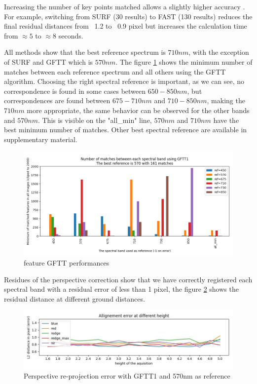 \documentclass[]{elsarticle}
\begin{document}
	\par Increasing the number of key points matched allows a slightly higher accuracy \cite{DantasDiasJunior, }.
	For example, switching from SURF (30 results) to FAST (130 results) reduces the final residual distances from ~1.2 to ~0.9 pixel but increases the calculation time from $\approx 5$ to $\approx 8$ seconds.
	\\
	\par All methods show that the best reference spectrum is $710nm$, with the exception of SURF and GFTT which is $570nm$.
	The figure \ref{fig:features-GFTT-performances} shows the minimum number of matches between each reference spectrum and all others using the GFTT algorithm.
	Choosing the right spectral reference is important, as we can see, no correspondence is found in some cases between $650-850nm$,
	but correspondences are found between $675-710nm$ and $710-850nm$, making the $710nm$ more appropriate,
	the same behavior can be observed for the other bands and $570nm$.
	This is visible on the "all\_min" line, $570nm$ and $710nm$ have the best minimum number of matches.
	Other best spectral reference are available in supplementary material.
	
	\begin{figure}[H]
		\centering
		\includegraphics[width=0.9\linewidth]{../figures/comparaison-keypoint-matching-reference-GFTT1.png}
		\caption{feature GFTT performances}
		\label{fig:features-GFTT-performances}
	\end{figure}
	
	\par Residues of the perspective correction show that we have correctly registered each spectral band with a residual error of less than 1 pixel,
	the figure \ref{fig:perspective-error} shows the residual distance at different ground distances.
	
	\begin{figure}[H]
		\centering
		\includegraphics[width=0.8\linewidth]{../figures/prespective-allignement-rmse.jpg}
		\caption{Perspective re-projection error with GFTT1 and 570nm as reference}
		\label{fig:perspective-error}
	\end{figure}
	
\end{document}
